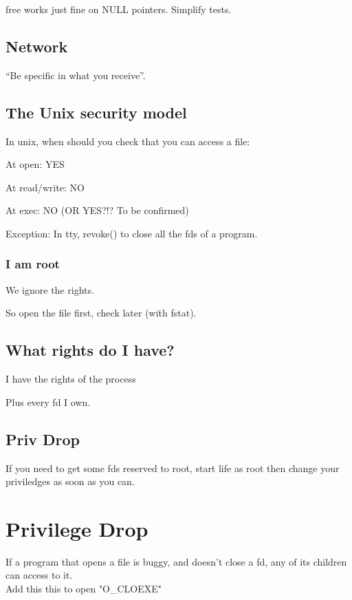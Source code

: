 \documentclass[a4paper,11pt]{article}
\begin{document}
free works just fine on NULL pointers. Simplify tests.

\subsection{Network}

``Be specific in what you receive''.

\subsection{The Unix security model}

In unix, when should you check that you can access a file:

At open: YES

At read/write: NO

At exec: NO (OR YES?!? To be confirmed)

Exception: In tty, revoke() to close all the fds of a program.

\subsubsection{I am root}

We ignore the rights.

So open the file first, check later (with fstat).

\subsection{What rights do I have?}

I have the rights of the process

Plus every fd I own.

\subsection{Priv Drop}

If you need to get some fds reserved to root, start life as root then
change your priviledges as soon as you can.


\section{Privilege Drop}
If a program that opens a file is buggy, and doesn't close a fd, any of its children can access to it.\\
Add this this to open "O_CLOEXE"\\
\end{document}
